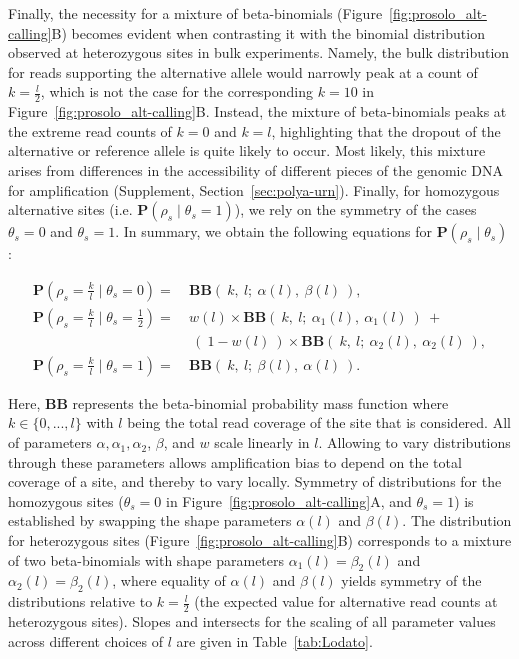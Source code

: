 \documentclass[12pt,inline]{wlscirep}
\newcommand{\Prob}{{\mathbf{P}}}
\newcommand{\cB}{{\mathbf{B}}}
\begin{document}
Finally, the necessity for a mixture of beta-binomials (Figure~\ref{fig:prosolo_alt-calling}B) becomes evident when contrasting it with the binomial distribution observed at heterozygous sites in bulk experiments.
Namely, the bulk distribution for reads supporting the alternative allele would narrowly peak at a count of $k=\frac{l}{2}$, which is not the case for the corresponding $k=10$ in Figure~\ref{fig:prosolo_alt-calling}B.
Instead, the mixture of beta-binomials peaks at the extreme read counts of $k=0$ and $k=l$, highlighting that the dropout of the alternative or reference allele is quite likely to occur.
Most likely, this mixture arises from differences in the accessibility of different pieces of the genomic DNA for amplification\cite{picher_trueprime_2016} (Supplement, Section~\ref{sec:polya-urn}).
Finally, for homozygous alternative sites (i.e. $\mathbf{P}(\rho_s\mid\theta_s=1)$), we rely on the symmetry of the cases $\theta_s=0$ and $\theta_s=1$.
In summary, we obtain the following equations for $\mathbf{P}(\rho_s\mid\theta_s)$:

\begin{equation}
	\label{eq:BBLodato}
	\begin{split}
		\Prob(\rho_s = \frac{k}{l} \mid \theta_s = 0 ) 			=~ &\cB\cB(~ k,~ l;~ \alpha(l),~ \beta(l)~ ),\\
		\Prob(\rho_s = \frac{k}{l} \mid \theta_s = \frac12) =~ &w(l) \times \cB\cB(~ k,~ l;~ \alpha_1(l),~ \alpha_1(l)~ )~ +\\
                                                       ~&~(~ 1-w(l)~ ) \times \cB\cB(~ k,~ l;~ \alpha_2(l),~ \alpha_2(l)~ ),\\
		\Prob(\rho_s = \frac{k}{l} \mid \theta_s = 1 ) 			=~ &\cB\cB(~ k,~ l;~ \beta(l),~ \alpha(l)~ ).
	\end{split}
\end{equation}

Here, $\cB\cB$ represents the beta-binomial probability mass function where $k\in\{0,...,l\}$ with $l$ being the total read coverage of the site that is considered. All of parameters $\alpha, \alpha_1,\alpha_2$, $\beta$, and $w$ scale linearly in $l$.
Allowing to vary distributions through these parameters allows amplification bias to depend on the total coverage of a site, and thereby to vary locally.
Symmetry of distributions for the homozygous sites ($\theta_s = 0$ in Figure~\ref{fig:prosolo_alt-calling}A, and $\theta_s = 1$) is established by swapping the shape parameters $\alpha(l)$ and $\beta(l)$.
The distribution for heterozygous sites (Figure~\ref{fig:prosolo_alt-calling}B) corresponds to a mixture of two beta-binomials with shape parameters $\alpha_1(l)=\beta_2(l)$ and $\alpha_2(l)=\beta_2(l)$, where equality of $\alpha(l)$ and $\beta(l)$ yields symmetry of the distributions relative to $k = \frac{l}{2}$ (the expected value for alternative read counts at heterozygous sites).
Slopes and intersects for the scaling of all parameter values across different choices of $l$ are given in Table~\ref{tab:Lodato}.
\end{document}
